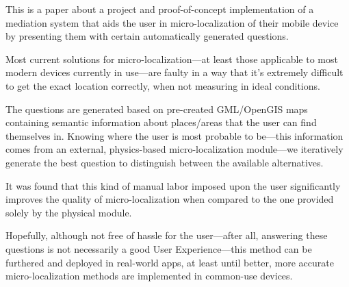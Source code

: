 This is a paper about a project and proof-of-concept implementation of a mediation system that aids the user in micro-localization of their mobile device by presenting them with certain automatically generated questions.

Most current solutions for micro-localization---at least those applicable to most modern devices currently in use---are faulty in a way that it's extremely difficult to get the exact location correctly, when not measuring in ideal conditions.

The questions are generated based on pre-created GML/OpenGIS maps containing semantic information about places/areas that the user can find themselves in. Knowing where the user is most probable to be---this information comes from an external, physics-based micro-localization module---we iteratively generate the best question to distinguish between the available alternatives.

It was found that this kind of manual labor imposed upon the user significantly improves the quality of micro-localization when compared to the one provided solely by the physical module.

Hopefully, although not free of hassle for the user---after all, answering these questions is not necessarily a good User Experience---this method can be furthered and deployed in real-world apps, at least until better, more accurate micro-localization methods are implemented in common-use devices.

